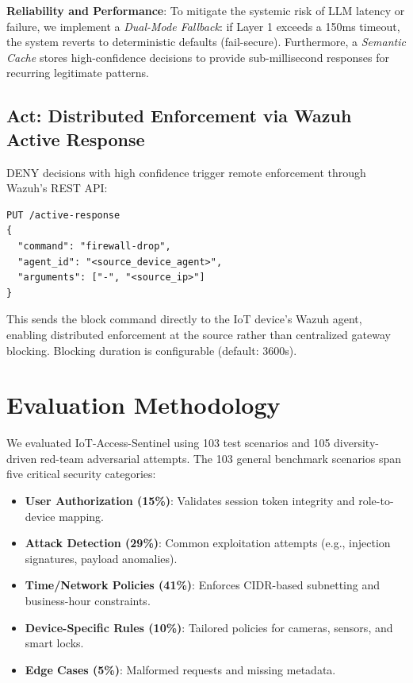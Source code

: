 \documentclass[conference]{IEEEtran}
\begin{document}
\textbf{Reliability and Performance}: To mitigate the systemic risk of LLM latency or failure, we implement a \textit{Dual-Mode Fallback}: if Layer 1 exceeds a 150ms timeout, the system reverts to deterministic defaults (fail-secure). Furthermore, a \textit{Semantic Cache} stores high-confidence decisions to provide sub-millisecond responses for recurring legitimate patterns.

\subsection{Act: Distributed Enforcement via Wazuh Active Response}

DENY decisions with high confidence trigger remote enforcement through Wazuh's REST API:
\begin{verbatim}
PUT /active-response
{
  "command": "firewall-drop",
  "agent_id": "<source_device_agent>",
  "arguments": ["-", "<source_ip>"]
}
\end{verbatim}

This sends the block command directly to the IoT device's Wazuh agent, enabling distributed enforcement at the source rather than centralized gateway blocking. Blocking duration is configurable (default: 3600s).

\section{Evaluation Methodology}

We evaluated IoT-Access-Sentinel using 103 test scenarios and 105 diversity-driven red-team adversarial attempts. The 103 general benchmark scenarios span five critical security categories:
\begin{itemize}
    \item \textbf{User Authorization (15\%)}: Validates session token integrity and role-to-device mapping.
    \item \textbf{Attack Detection (29\%)}: Common exploitation attempts (e.g., injection signatures, payload anomalies).
    \item \textbf{Time/Network Policies (41\%)}: Enforces CIDR-based subnetting and business-hour constraints.
    \item \textbf{Device-Specific Rules (10\%)}: Tailored policies for cameras, sensors, and smart locks.
    \item \textbf{Edge Cases (5\%)}: Malformed requests and missing metadata.
\end{itemize}
\end{document}
